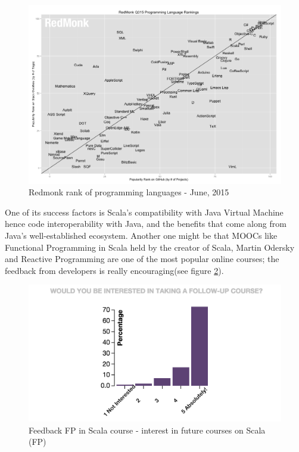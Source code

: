 \documentclass{article}
\begin{document}
\begin{figure}[h!]
  \includegraphics[width=\linewidth]{redmonk-rank.png}
  \caption{Redmonk rank of programming languages - June, 2015}
  \label{fig:redmonk-rank}
\end{figure}

One of its success factors is  Scala's compatibility with Java Virtual Machine hence code interoperability with Java, and the benefits that come along from  Java's well-established ecosystem. Another one might be that MOOCs  like Functional Programming in Scala \cite{scalastat:1} held  by the creator of Scala, Martin Odersky and Reactive Programming are one of the most popular online courses; the feedback from developers is really encouraging(see figure \ref{fig:interest}). \par

\begin{figure}[h!]
  \includegraphics[width=\linewidth]{interest.png}
  \caption{Feedback FP in Scala course - interest in future courses on Scala (FP)}
  \label{fig:interest}
\end{figure}
\end{document}

